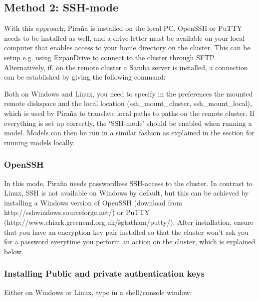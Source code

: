 \documentclass[a4,11pt]{report} \usepackage[pdftex]{graphicx}
\begin{document}
{{\subsection{Method 2: SSH-mode}

With this approach, Pira\~na is installed on the local PC. OpenSSH or
PuTTY needs to be installed as well, and a drive-letter must be
available on your local computer that enables access to your home
directory on the cluster. This can be setup e.g. using ExpanDrive to
connect to the cluster through SFTP. Alternatively, if, on the remote
cluster a Samba server is installed, a connection can be established
by giving the following command:

\vspace{6pt} \normalfont \vspace{6pt}

\noindent Both on Windows and Linux, you need to specify in the
preferences the mounted remote diskspace and the local location
(ssh\_mount\_cluster, ssh\_mount\_local), which is used by Pira\~na to
translate local paths to paths on the remote cluster.  If everything
is set up correctly, the `SSH-mode' should be enabled when running a
model. Models can then be run in a similar fashion as explained in the
section for running models locally.

\subsubsection*{OpenSSH} In this mode, Pira\~na needs passwordless
SSH-access to the cluster. In contrast to Linux, SSH is not available
on Windows by default, but this can be achieved by installing a
Windows version of OpenSSH (download from
http://sshwindows.sourceforge.net/) or PuTTY
(http://www.chiark.greenend.org.uk/\~ sgtatham/putty/). After
installation, ensure that you have an encryption key pair installed so
that the cluster won't ask you for a password everytime you perform an
action on the cluster, which is explained below.

\subsubsection*{Installing Public and private authentication keys}

Either on Windows or Linux, type in a shell/console window:

\vspace{6pt} \normalfont \vspace{6pt}

}}
\end{document}
